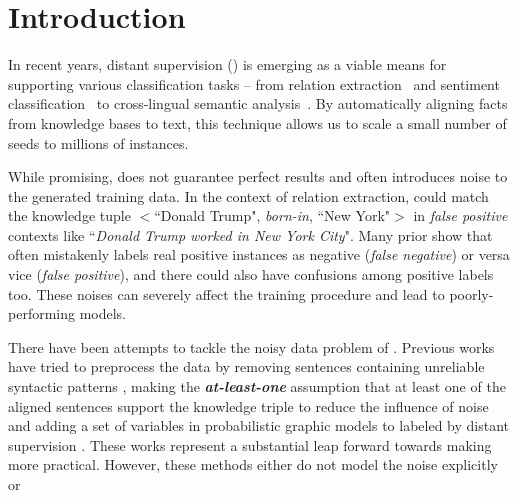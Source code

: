 \section{Introduction}

In recent years, distant supervision (\DS) is emerging as a viable means for supporting various classification tasks -- from relation extraction~\cite{mintz2009distant} and sentiment classification~\cite{go2009twitter} to cross-lingual semantic
analysis~\cite{fang2016learning}. By automatically aligning
facts from knowledge bases to text, this technique allows us to scale a small number of seeds to millions of instances.



While promising, \DS does not guarantee perfect results and often introduces noise to the
generated training data. In the context of relation extraction, \DS could match the knowledge tuple $<$``Donald Trump",
\emph{born-in}, ``New York"$>$  in \emph{false positive} contexts like ``\emph{Donald Trump worked in New York City}".
Many prior  show that \DS often mistakenly labels real positive instances as negative (\emph{false negative}) or
versa vice (\emph{false positive}), and there could also have confusions among positive labels too. These noises can
severely affect the training
procedure and lead to poorly-performing models.

There have been attempts to tackle the noisy data problem of \DS. Previous works have tried to preprocess the data by removing sentences containing unreliable syntactic patterns \cite{takamatsu2012reducing}, making the \textbf{\textit{at-least-one}} assumption that at least one of the aligned sentences support the knowledge triple to reduce the influence of noise \cite{riedel2010modeling} and adding a set of variables in probabilistic graphic models to  labeled by distant supervision \cite{hoffmann2011knowledge,surdeanu2012multi}. These works represent a substantial leap forward towards making \DS more practical. However, these methods either do not model the noise explicitly or 

